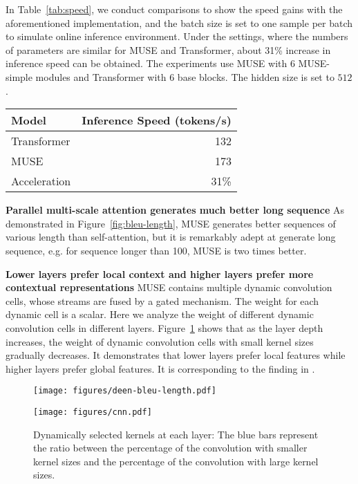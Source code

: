 \documentclass{article} \usepackage{iclr2020_conference,times}
\begin{document}
In Table~\ref{tab:speed}, we conduct comparisons to show the speed gains with the aforementioned implementation, and the batch size is set to one sample per batch to simulate online inference environment. Under the settings, where the numbers of parameters are similar for MUSE and Transformer, about 31\% increase in inference speed can be obtained. The experiments use MUSE with $6$ MUSE-simple modules and Transformer with $6$ base blocks. The hidden size is set to $512$. 



\begin{table*}[ht]
\centering
\begin{tabular}{lr}
\toprule
Model  & Inference Speed (tokens/s) \\
\midrule
Transformer  &  132 \\
MUSE  & 173 \\ \midrule
Acceleration & 31\% \\
\bottomrule
\end{tabular}
\caption{The comparison between the inference speed  of  MUSE and Transformer.}
\label{tab:speed}
\end{table*}

\textbf{Parallel multi-scale attention generates  much better long sequence}
As demonstrated in Figure~\ref{fig:bleu-length}, MUSE generates better  sequences of various length than self-attention, but it is remarkably adept at generate long sequence, e.g. for sequence longer than 100, MUSE is two times better.

\textbf{Lower layers prefer local context and higher layers prefer more contextual representations}
MUSE contains multiple dynamic convolution cells, whose streams are fused by a gated mechanism. The weight for each dynamic cell is a scalar. Here we analyze the weight of different dynamic convolution cells in different layers.  
Figure~\ref{fig:layer-k} shows that as the layer depth increases, the weight of dynamic convolution cells with small kernel sizes gradually decreases. It demonstrates that lower layers prefer local features while higher layers prefer global features. It is corresponding to the finding in \citet{ramach2019standalone}.



\begin{figure}[ht]
\centering
\begin{minipage}[]{0.46\linewidth}  
\texttt{[image: figures/deen-bleu-length.pdf]}
\caption{BLEU scores of models on different groups with different source sentence lengths. The experiments are conducted on the De-En dataset. MUSE performs better than Transformer, especially on long sentences.}
\label{fig:bleu-length}
\end{minipage}
\qquad
\begin{minipage}[]{0.46\linewidth} 
\texttt{[image: figures/cnn.pdf]}
\caption{Dynamically selected kernels at each layer: The blue bars represent the ratio between the percentage of the  convolution with  smaller kernel sizes and the percentage of the convolution with large kernel sizes.}
\label{fig:layer-k}
\end{minipage}
\end{figure}
\end{document}
